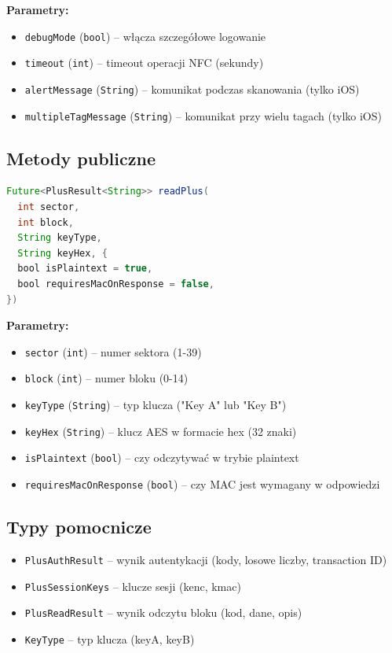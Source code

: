 \documentclass[a4paper,12pt]{article}
\begin{document}
\textbf{Parametry:}
\begin{itemize}
    \item \texttt{debugMode} (\texttt{bool}) -- włącza szczegółowe logowanie
    \item \texttt{timeout} (\texttt{int}) -- timeout operacji NFC (sekundy)
    \item \texttt{alertMessage} (\texttt{String}) -- komunikat podczas skanowania (tylko iOS)
    \item \texttt{multipleTagMessage} (\texttt{String}) -- komunikat przy wielu tagach (tylko iOS)
\end{itemize}

\subsection{Metody publiczne}
\begin{lstlisting}[language=Java]
Future<PlusResult<String>> readPlus(
  int sector,
  int block,
  String keyType,
  String keyHex, {
  bool isPlaintext = true,
  bool requiresMacOnResponse = false,
})
\end{lstlisting}

\textbf{Parametry:}
\begin{itemize}
    \item \texttt{sector} (\texttt{int}) -- numer sektora (1-39)
    \item \texttt{block} (\texttt{int}) -- numer bloku (0-14)
    \item \texttt{keyType} (\texttt{String}) -- typ klucza ("Key A" lub "Key B")
    \item \texttt{keyHex} (\texttt{String}) -- klucz AES w formacie hex (32 znaki)
    \item \texttt{isPlaintext} (\texttt{bool}) -- czy odczytywać w trybie plaintext
    \item \texttt{requiresMacOnResponse} (\texttt{bool}) -- czy MAC jest wymagany w odpowiedzi
\end{itemize}

\subsection{Typy pomocnicze}
\begin{itemize}
    \item \texttt{PlusAuthResult} -- wynik autentykacji (kody, losowe liczby, transaction ID)
    \item \texttt{PlusSessionKeys} -- klucze sesji (kenc, kmac)
    \item \texttt{PlusReadResult} -- wynik odczytu bloku (kod, dane, opis)
    \item \texttt{KeyType} -- typ klucza (keyA, keyB)
\end{itemize}
\end{document}

